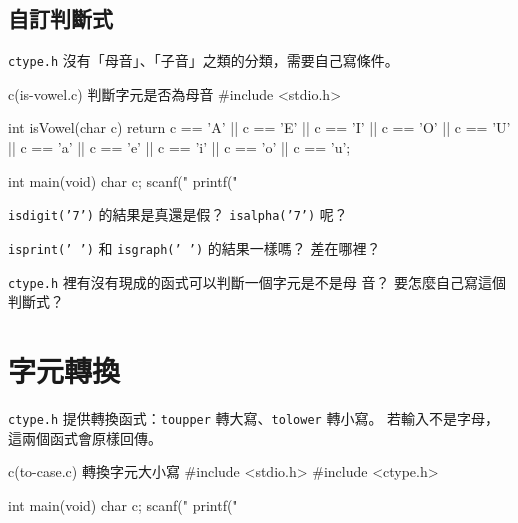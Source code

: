 
\subsection{自訂判斷式}

\texttt{ctype.h} 沒有「母音」、「子音」之類的分類，需要自己寫條件。

\begin{example}{c}{(is-vowel.c) 判斷字元是否為母音}
#include <stdio.h>

int isVowel(char c) {
    return c == 'A' || c == 'E' || c == 'I' || c == 'O' || c == 'U' ||
           c == 'a' || c == 'e' || c == 'i' || c == 'o' || c == 'u';
}

int main(void) {
    char c;
    scanf("%
    printf("%
}
\end{example}


\begin{drills}[label=drills:char-classify]
\item \texttt{isdigit('7')} 的結果是真還是假？ \texttt{isalpha('7')}
呢？
\item \texttt{isprint(' ')} 和 \texttt{isgraph(' ')} 的結果一樣嗎？
差在哪裡？
\item \texttt{ctype.h} 裡有沒有現成的函式可以判斷一個字元是不是母
音？ 要怎麼自己寫這個判斷式？
\end{drills}

\section{字元轉換}
\label{sec:char-convert}

\texttt{ctype.h} 提供轉換函式：\texttt{toupper} 轉大寫、\texttt{tolower}
轉小寫。 若輸入不是字母，這兩個函式會原樣回傳。

\begin{example}{c}{(to-case.c) 轉換字元大小寫}
#include <stdio.h>
#include <ctype.h>

int main(void) {
    char c;
    scanf("%
    printf("%
}
\end{example}


